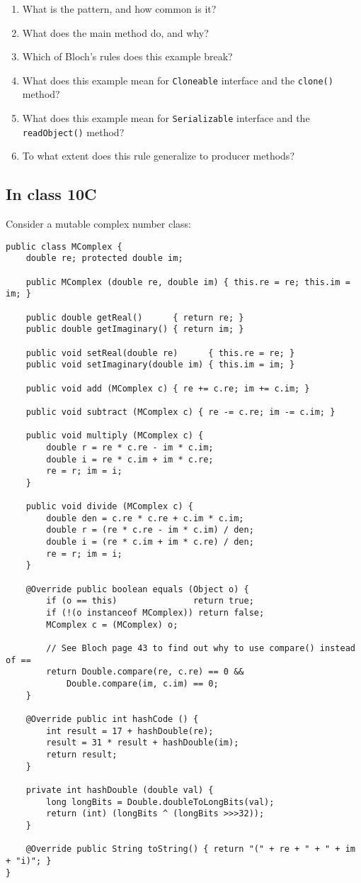 \documentclass[11pt]{article}
\begin{document}
\begin{enumerate}
\item What is the pattern, and how common is it?
\item What does the main method do, and why?
\item Which of Bloch's rules does this example break?
\item What does this example mean for \texttt{Cloneable} interface and the \texttt{clone()} method?
\item What does this example mean for \texttt{Serializable} interface and the \texttt{readObject()} method?
\item To what extent does this rule generalize to producer methods?
\end{enumerate}

\subsection{In class 10C}
\label{sec:org87161aa}
Consider a mutable complex number class:

\begin{verbatim}
public class MComplex {
    double re; protected double im;

    public MComplex (double re, double im) { this.re = re; this.im = im; }

    public double getReal()      { return re; }
    public double getImaginary() { return im; }

    public void setReal(double re)      { this.re = re; }
    public void setImaginary(double im) { this.im = im; }

    public void add (MComplex c) { re += c.re; im += c.im; }

    public void subtract (MComplex c) { re -= c.re; im -= c.im; }

    public void multiply (MComplex c) {
        double r = re * c.re - im * c.im;
        double i = re * c.im + im * c.re;
        re = r; im = i;
    }

    public void divide (MComplex c) {
        double den = c.re * c.re + c.im * c.im;
        double r = (re * c.re - im * c.im) / den;
        double i = (re * c.im + im * c.re) / den;
        re = r; im = i;
    }

    @Override public boolean equals (Object o) {
        if (o == this)               return true;
        if (!(o instanceof MComplex)) return false;
        MComplex c = (MComplex) o;

        // See Bloch page 43 to find out why to use compare() instead of ==
        return Double.compare(re, c.re) == 0 &&
            Double.compare(im, c.im) == 0;
    }

    @Override public int hashCode () {
        int result = 17 + hashDouble(re);
        result = 31 * result + hashDouble(im);
        return result;
    }

    private int hashDouble (double val) {
        long longBits = Double.doubleToLongBits(val);
        return (int) (longBits ^ (longBits >>>32));
    }

    @Override public String toString() { return "(" + re + " + " + im + "i)"; }
}

\end{verbatim}
\end{document}
